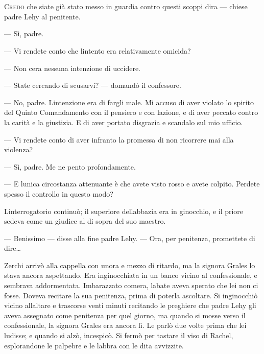 	\chapter{\phantom{text}}

\lettrine{C}{redo} che siate già stato messo in guardia contro questi scoppi
d\textquotesingle ira --- chiese padre Lehy al penitente.

--- Sì, padre.

--- Vi rendete conto che l\textquotesingle intento era relativamente
omicida?

--- Non c\textquotesingle era nessuna intenzione di uccidere.

--- State cercando di scusarvi? --- domandò il confessore.

--- No, padre. L\textquotesingle intenzione era di fargli male. Mi
accuso di aver violato lo spirito del Quinto Comandamento con il
pensiero e con l\textquotesingle azione, e di aver peccato contro la
carità e la giustizia. E di aver portato disgrazia e scandalo sul mio
ufficio.

--- Vi rendete conto di aver infranto la promessa di non ricorrere mai
alla violenza?

--- Sì, padre. Me ne pento profondamente.

--- E l\textquotesingle unica circostanza attenuante è che avete visto
rosso e avete colpito. Perdete spesso il controllo in questo modo?

L\textquotesingle interrogatorio continuò; il superiore
dell\textquotesingle abbazia era in ginocchio, e il priore sedeva come
un giudice al di sopra del suo maestro.

--- Benissimo --- disse alla fine padre Lehy. --- Ora, per penitenza,
promettete di dire\ldots{}

Zerchi arrivò alla cappella con un\textquotesingle ora e mezzo di
ritardo, ma la signora Grales lo stava ancora aspettando. Era
inginocchiata in un banco vicino al confessionale, e sembrava
addormentata. Imbarazzato com\textquotesingle era,
l\textquotesingle abate aveva sperato che lei non ci fosse. Doveva
recitare la sua penitenza, prima di poterla ascoltare. Si inginocchiò
vicino all\textquotesingle altare e trascorse venti minuti recitando le
preghiere che padre Lehy gli aveva assegnato come penitenza per quel
giorno, ma quando si mosse verso il confessionale, la signora Grales era
ancora lì. Le parlò due volte prima che lei l\textquotesingle udisse; e
quando si alzò, incespicò. Si fermò per tastare il viso di Rachel,
esplorandone le palpebre e le labbra con le dita avvizzite.

